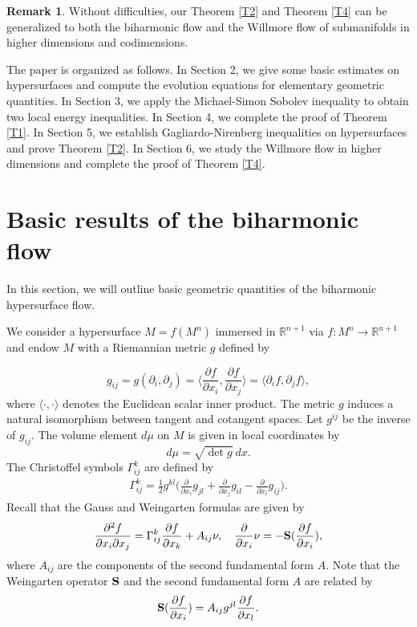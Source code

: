 \documentclass{amsart}
\theoremstyle{definition}
\newtheorem{remark}{Remark}
\numberwithin{equation}{section}
\begin{document}
 \begin{remark}  Without  difficulties,   our Theorem  \ref{T2} and Theorem  \ref{T4} can be generalized to   both the biharmonic  flow and  the  Willmore  flow of  submanifolds in  higher dimensions and codimensions.
\end{remark}

The paper is organized as follows. In Section 2, we give some  basic estimates on  hypersurfaces and  compute the evolution
equations for elementary
geometric quantities.  In Section 3,  we apply the Michael-Simon Sobolev inequality to obtain two local energy inequalities. In Section 4, we
complete the proof of  Theorem \ref{T1}.
 In Section 5, we establish
Gagliardo-Nirenberg inequalities on hypersurfaces and prove  Theorem  \ref{T2}.  In Section 6, we study the Willmore flow in higher dimensions and complete the proof of  Theorem  \ref{T4}.



\section{Basic results of the  biharmonic flow} \label{S:notation}
In this section, we will outline  basic geometric quantities of  the  biharmonic hypersurface flow.

We consider a hypersurface $M=f(M^n)$ immersed in $\mathbb R^{n+1}$ via
$f: M^n\rightarrow \mathbb R^{n+1}$ and endow $M$ with a
Riemannian metric $g$ defined by

$$g_{ij}=g(\partial_i,\partial_j)=\langle
\frac{\partial f}{\partial x_i},
\frac{\partial f}{\partial x_j}\rangle=\langle \partial_i f, \partial_j f\rangle,$$
where $\langle\cdot, \cdot\rangle$ denotes the Euclidean scalar
inner product. The metric $g$ induces a natural isomorphism between
tangent and cotangent spaces. Let
$g^{ij}$ be   the inverse of $g_{ij}$.   The volume element $d\mu$ on $M$ is given in local coordinates by
$$ d\mu=\sqrt{\det g}~ dx. $$
 The Christoffel symbols $\Gamma^{k}_{ij}$ are defined by
\begin{align}
 \Gamma^{k}_{ij} =\frac{1}{2} g^{kl}\Big(\frac{\partial}{\partial x_i }g_{jl}+
 \frac{\partial}{\partial x_j }g_{il}-\frac{\partial}{\partial x_l }g_{ij}\Big).\nonumber
\end{align}
Recall that the Gauss and Weingarten formulas are given by
\begin{align}\label{GW}
\frac{\partial^2 f}{\partial x_i \partial
    x_j}=\Gamma_{ij}^k\frac{\partial f}{\partial x_k}+A_{ij}\nu,\quad
\frac{\partial}{\partial x_i} \nu=-{{}\bf S} (\frac{\partial f}{\partial x_i}),
\end{align}
where $A_{ij}$ are the components of the second fundamental form
$A$. Note that the Weingarten operator ${\bf S}$ and the second fundamental form $A$ are related by
\begin{align}\label{Wag}
{\bf S} (\frac{\partial f}{\partial x_i})=A_{ij}g^{jl}\frac{\partial
    f}{\partial x_l}.\end{align}
\end{document}
